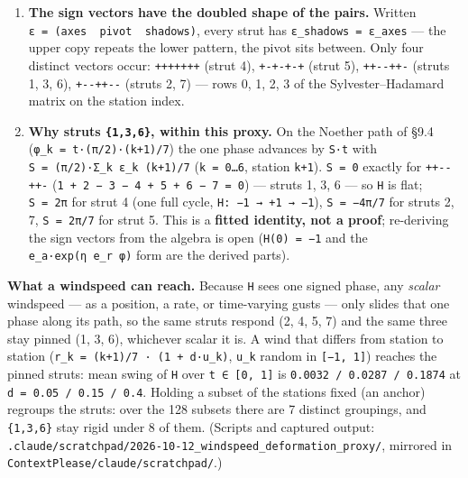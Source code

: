 \documentclass[
  10pt,
]{article}
\providecommand{\tightlist}{%
  \setlength{\itemsep}{0pt}\setlength{\parskip}{0pt}}
\begin{document}
\begin{enumerate}
\def\labelenumi{\arabic{enumi}.}
\tightlist
\item
  \textbf{The sign vectors have the doubled shape of the pairs.} Written
  \texttt{ε\ =\ (axes\ \textbar{}\ pivot\ \textbar{}\ shadows)}, every
  strut has \texttt{ε\_shadows\ =\ ε\_axes} --- the upper copy repeats
  the lower pattern, the pivot sits between. Only four distinct vectors
  occur: \texttt{+++\textbar{}+\textbar{}+++} (strut 4),
  \texttt{+-+\textbar{}-\textbar{}+-+} (strut 5),
  \texttt{++-\textbar{}-\textbar{}++-} (struts 1, 3, 6),
  \texttt{+-\/-\textbar{}+\textbar{}+-\/-} (struts 2, 7) --- rows 0, 1,
  2, 3 of the Sylvester--Hadamard matrix on the station index.
\item
  \textbf{Why struts \texttt{\{1,3,6\}}, within this proxy.} On the
  Noether path of §9.4 (\texttt{φ\_k\ =\ t·(π/2)·(k+1)/7}) the one phase
  advances by \texttt{S·t} with \texttt{S\ =\ (π/2)·Σ\_k\ ε\_k\ (k+1)/7}
  (\texttt{k\ =\ 0…6}, station \texttt{k+1}). \texttt{S\ =\ 0} exactly
  for \texttt{++-\textbar{}-\textbar{}++-}
  (\texttt{1\ +\ 2\ −\ 3\ −\ 4\ +\ 5\ +\ 6\ −\ 7\ =\ 0}) --- struts 1,
  3, 6 --- so \texttt{H} is flat; \texttt{S\ =\ 2π} for strut 4 (one
  full cycle, \texttt{H:\ −1\ →\ +1\ →\ −1}), \texttt{S\ =\ −4π/7} for
  struts 2, 7, \texttt{S\ =\ 2π/7} for strut 5. This is a \textbf{fitted
  identity, not a proof}; re-deriving the sign vectors from the algebra
  is open (\texttt{H(0)\ =\ −1} and the \texttt{e\_a·exp(η\ e\_r\ φ)}
  form are the derived parts).
\end{enumerate}

\textbf{What a windspeed can reach.} Because \texttt{H} sees one signed
phase, any \emph{scalar} windspeed --- as a position, a rate, or
time-varying gusts --- only slides that one phase along its path, so the
same struts respond (2, 4, 5, 7) and the same three stay pinned (1, 3,
6), whichever scalar it is. A wind that differs from station to station
(\texttt{r\_k\ =\ (k+1)/7\ ·\ (1\ +\ d·u\_k)}, \texttt{u\_k} random in
\texttt{{[}−1,\ 1{]}}) reaches the pinned struts: mean swing of
\texttt{H} over \texttt{t\ ∈\ {[}0,\ 1{]}} is
\texttt{0.0032\ /\ 0.0287\ /\ 0.1874} at
\texttt{d\ =\ 0.05\ /\ 0.15\ /\ 0.4}. Holding a subset of the stations
fixed (an anchor) regroups the struts: over the 128 subsets there are 7
distinct groupings, and \texttt{\{1,3,6\}} stay rigid under 8 of them.
(Scripts and captured output:
\texttt{.claude/scratchpad/2026-10-12\_windspeed\_deformation\_proxy/},
mirrored in \texttt{ContextPlease/claude/scratchpad/}.)
\end{document}
